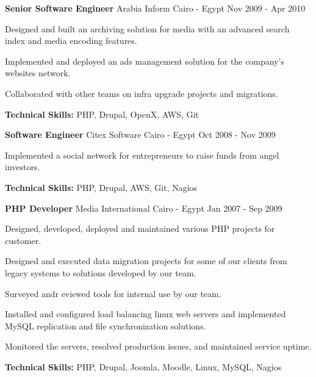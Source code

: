 \begin{cventries}
  \cventry
    {\textbf{Senior Software Engineer}} %
    {Arabia Inform} %
    {Cairo - Egypt} %
    {Nov 2009 - Apr 2010} %
    {
      \begin{cvitems} %
        \item {Designed and built an archiving solution for media with an advanced search index and media encoding features.}
        \item {Implemented and deployed an ads management solution for the company’s websites network.}
        \item {Collaborated with other teams on infra upgrade projects and migrations.}
        \item {\textbf{Technical Skills:} PHP, Drupal, OpenX, AWS, Git}
      \end{cvitems}
    }

  \cventry
    {\textbf{Software Engineer}} %
    {Citex Software} %
    {Cairo - Egypt} %
    {Oct 2008 - Nov 2009} %
    {
      \begin{cvitems} %
        \item {Implemented a social network for entrepreneurs to raise funds from angel investors.}
        \item {\textbf{Technical Skills:} PHP, Drupal, AWS, Git, Nagios}
      \end{cvitems}
    }

  \cventry
    {\textbf{PHP Developer}} %
    {Media International} %
    {Cairo - Egypt} %
    {Jan 2007 - Sep 2009} %
    {
      \begin{cvitems} %
        \item {Designed, developed, deployed and maintained various PHP projects for customer.}
        \item {Designed and executed data migration projects for some of our clients from legacy systems to solutions developed by our team.}
        \item {Surveyed andr eviewed tools for internal use by our team.}
        \item {Installed and configured load balancing linux web servers and implemented MySQL replication and file synchronization solutions.}
        \item {Monitored the servers, resolved production issues, and maintained service uptime.}
        \item {\textbf{Technical Skills:} PHP, Drupal, Joomla, Moodle, Linux, MySQL, Nagios}
      \end{cvitems}
    }


\end{cventries}

